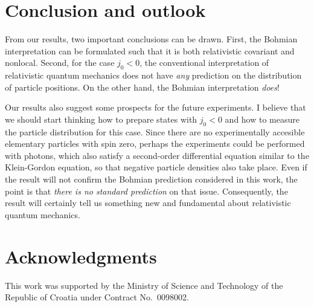 \documentclass[12pt]{article} %
\begin{document}
\section{Conclusion and outlook}
  
From our results, two important conclusions can be drawn.
First, the
Bohmian interpretation can be formulated such that 
it is both relativistic covariant and nonlocal. 
Second, for the case $j_0<0$, the
conventional interpretation of relativistic quantum mechanics  
does not have {\em any} prediction on the distribution of particle positions. 
On the other hand, the Bohmian interpretation {\em does}! 

Our results also suggest some
prospects for the future experiments. I believe that
we should start thinking how to prepare states with $j_0<0$
and how to measure the particle distribution for this case.
Since there are no experimentally 
accesible elementary particles with spin zero, perhaps the 
experiments could be performed with photons, which also 
satisfy a second-order differential equation similar to the 
Klein-Gordon equation, so that negative particle densities 
also take place.
Even if the result will not confirm the Bohmian prediction 
considered in this work, the point is that {\em there is no
standard prediction} on that issue. Consequently,
the result will certainly tell us something new and fundamental about 
relativistic quantum mechanics. 


\section*{Acknowledgments}

This work was supported by the Ministry of Science and Technology of the
Republic of Croatia under Contract No.~0098002.
 
\end{document}
